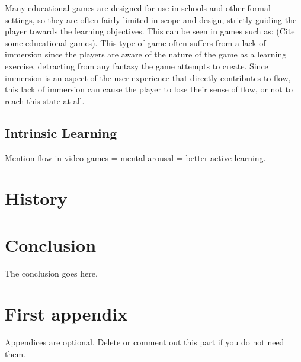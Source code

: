 \documentclass[journal]{IEEEtran}
\begin{document}
Many educational games are designed for use in schools and other formal settings, so they are often fairly limited in scope and design, \cite{Something} strictly guiding the player towards the learning objectives. This can be seen in games such as: (Cite some educational games). This type of game often suffers from a lack of immersion since the players are aware of the nature of the game as a learning exercise, detracting from any fantasy the game attempts to create. Since immersion is an aspect of the user experience that directly contributes to flow, \cite{GameUXElements} this lack of immersion can cause the player to lose their sense of flow, or not to reach this state at all. 


\subsection{Intrinsic Learning}


Mention flow in video games = mental arousal = better active learning.

\section{History}


\section{Conclusion}
The conclusion goes here.






\appendices
\section{First appendix}
Appendices are optional. Delete or comment out this part if you do not need them.

\end{document}
